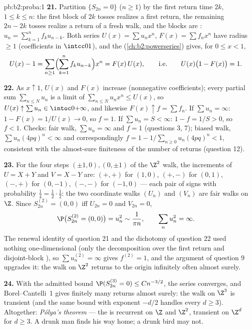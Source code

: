 \begin{solution}{pb:b2:proba:1}
\textbf{21.} Partition $\{S_{2n} = 0\}$ ($n \geq 1$) by the
first return time $2k$, $1 \leq k \leq n$: the first block of
$2k$ tosses realizes a first return, the remaining $2n - 2k$
tosses realize a return of a fresh walk, and the blocks are
: $u_n = \sum_{k=1}^nf_ku_{n-k}$. Both series
$U(x) = \sum u_nx^n$, $F(x) = \sum f_nx^n$ have radius $\geq
1$ (coefficients in $\intcc01$), and the 
(\cref{ch:b2:powerseries}) gives, for $0 \leq x < 1$,
\[
U(x) - 1 = \sum_{n\geq1}\Bigl(\sum_{k=1}^n
f_ku_{n-k}\Bigr)x^n = F(x)\,U(x),
\qquad\text{i.e.}\qquad
U(x)\bigl(1 - F(x)\bigr) = 1 .
\]

\textbf{22.} As $x \uparrow 1$, $U(x)$ and $F(x)$ increase
(nonnegative coefficients); every partial sum $\sum_{n\leq
N}u_n$ is a limit of $\sum_{n\leq N}u_nx^n \leq U(x)$, so
$U(x) \uparrow \sum u_n \in \intoc0{+\infty}$, and likewise
$F(x) \uparrow f = \sum f_n$. If $\sum u_n = \infty$: $1 -
F(x) = 1/U(x) \to 0$, so $f = 1$. If $\sum u_n = S < \infty$:
$1 - f = 1/S > 0$, so $f < 1$. Checks: fair walk, $\sum u_n =
\infty$ and $f = 1$ (questions 3, 7); biased walk, $\sum
u_n(4pq)^n < \infty$ and correspondingly $f = 1 -
1/\sum_{n\geq0}u_n(4pq)^n < 1$, consistent with the
almost-sure finiteness of the number of returns (question
12).

\textbf{23.} For the four steps $(\pm1, 0), (0, \pm1)$ of the
$\Z^2$ walk, the increments of $U = X + Y$ and $V = X - Y$
are: $(+,+)$ for $(1,0)$, $(+,-)$ for $(0,1)$, $(-,+)$ for
$(0,-1)$, $(-,-)$ for $(-1,0)$ --- each pair of signs with
probability $\frac14 = \frac12\cdot\frac12$: the two
coordinate walks $(U_n)$ and $(V_n)$ are  fair
walks on $\Z$. Since $S^{(2)}_{2n} = (0,0)$ iff $U_{2n} = 0$
and $V_{2n} = 0$,
\[
\P\bigl(S^{(2)}_{2n} = (0,0)\bigr) = u_n^2 \sim \frac1{\pi
n}, \qquad \sum_nu_n^2 = \infty .
\]
The renewal identity of question 21 and the dichotomy of
question 22 used nothing one-dimensional (only the
decomposition over the first return and disjoint-block
), so $\sum u_n^{(2)} = \infty$ gives $f^{(2)} =
1$, and the argument of question 9 upgrades it: the walk on
$\Z^2$ returns to the origin infinitely often almost surely.

\textbf{24.} With the admitted bound $\P(S^{(3)}_{2n} = 0)
\leq Cn^{-3/2}$, the series converges, and Borel--Cantelli~1
gives finitely many returns almost surely: the walk on
$\Z^3$ is transient (and the same bound with exponent $-d/2$
handles every $d \geq 3$). Altogether: \emph{P\'olya's
theorem} --- the  is recurrent on $\Z$ and
$\Z^2$, transient on $\Z^d$ for $d \geq 3$. A drunk man finds
his way home; a drunk bird may not.


\end{solution}
